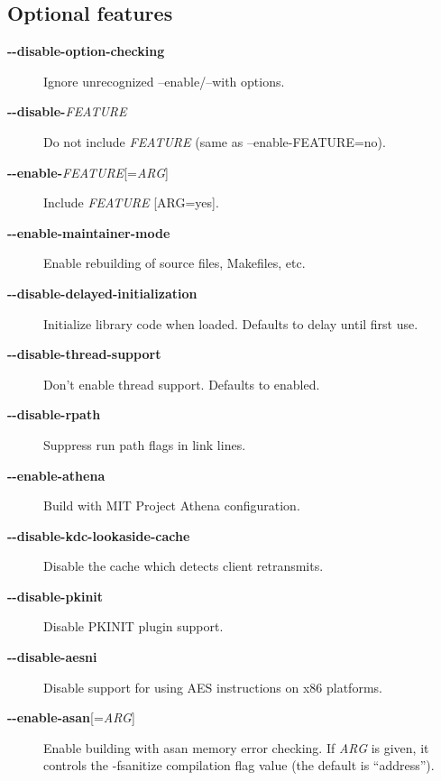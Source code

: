\documentclass[letterpaper,10pt,english]{sphinxmanual}
\begin{document}
\subsection{Optional features}
\label{build/options2configure:optional-features}\begin{description}
\item[{\textbf{-}\textbf{-disable-option-checking}}] \leavevmode
Ignore unrecognized --enable/--with options.

\item[{\textbf{-}\textbf{-disable-}\emph{FEATURE}}] \leavevmode
Do not include \emph{FEATURE} (same as --enable-FEATURE=no).

\item[{\textbf{-}\textbf{-enable-}\emph{FEATURE}{[}=\emph{ARG}{]}}] \leavevmode
Include \emph{FEATURE} {[}ARG=yes{]}.

\item[{\textbf{-}\textbf{-enable-maintainer-mode}}] \leavevmode
Enable rebuilding of source files, Makefiles, etc.

\item[{\textbf{-}\textbf{-disable-delayed-initialization}}] \leavevmode
Initialize library code when loaded.  Defaults to delay until
first use.

\item[{\textbf{-}\textbf{-disable-thread-support}}] \leavevmode
Don't enable thread support.  Defaults to enabled.

\item[{\textbf{-}\textbf{-disable-rpath}}] \leavevmode
Suppress run path flags in link lines.

\item[{\textbf{-}\textbf{-enable-athena}}] \leavevmode
Build with MIT Project Athena configuration.

\item[{\textbf{-}\textbf{-disable-kdc-lookaside-cache}}] \leavevmode
Disable the cache which detects client retransmits.

\item[{\textbf{-}\textbf{-disable-pkinit}}] \leavevmode
Disable PKINIT plugin support.

\item[{\textbf{-}\textbf{-disable-aesni}}] \leavevmode
Disable support for using AES instructions on x86 platforms.

\item[{\textbf{-}\textbf{-enable-asan}{[}=\emph{ARG}{]}}] \leavevmode
Enable building with asan memory error checking.  If \emph{ARG} is
given, it controls the -fsanitize compilation flag value (the
default is ``address'').

\end{description}
\end{document}
